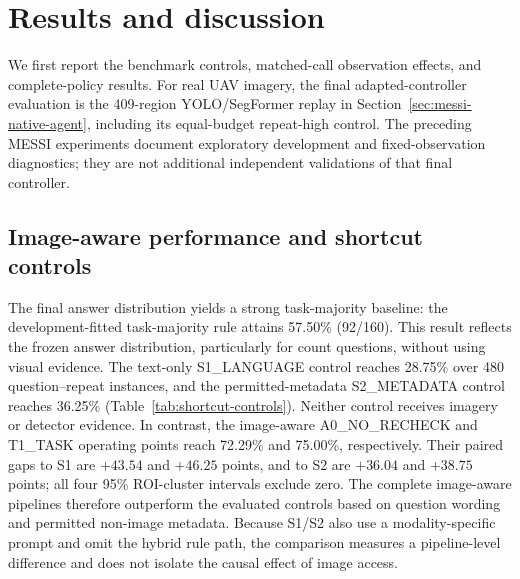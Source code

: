 \section{Results and discussion}
\label{sec:results}
We first report the benchmark controls, matched-call observation effects, and complete-policy results. For real UAV imagery, the final adapted-controller evaluation is the 409-region YOLO/SegFormer replay in Section~\ref{sec:messi-native-agent}, including its equal-budget repeat-high control. The preceding MESSI experiments document exploratory development and fixed-observation diagnostics; they are not additional independent validations of that final controller.

\subsection{Image-aware performance and shortcut controls}
The final answer distribution yields a strong task-majority baseline: the development-fitted task-majority rule attains 57.50\% (92/160). This result reflects the frozen answer distribution, particularly for count questions, without using visual evidence. The text-only S1\_LANGUAGE control reaches 28.75\% over 480 question--repeat instances, and the permitted-metadata S2\_METADATA control reaches 36.25\% (Table~\ref{tab:shortcut-controls}). Neither control receives imagery or detector evidence. In contrast, the image-aware A0\_NO\_RECHECK and T1\_TASK operating points reach 72.29\% and 75.00\%, respectively. Their paired gaps to S1 are $+43.54$ and $+46.25$ points, and to S2 are $+36.04$ and $+38.75$ points; all four 95\% ROI-cluster intervals exclude zero. The complete image-aware pipelines therefore outperform the evaluated controls based on question wording and permitted non-image metadata. Because S1/S2 also use a modality-specific prompt and omit the hybrid rule path, the comparison measures a pipeline-level difference and does not isolate the causal effect of image access.


